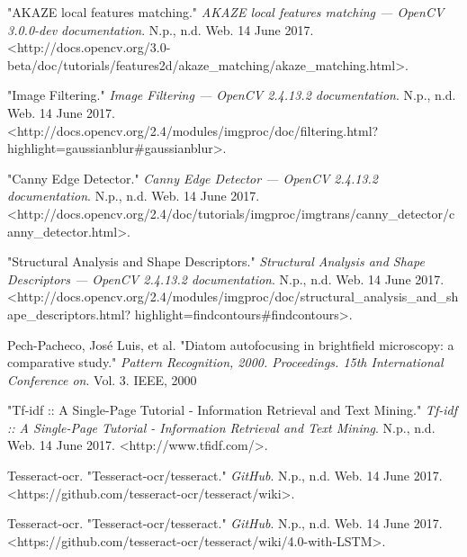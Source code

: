 \begin{lstlisting}

\end{lstlisting}




\begin{thebibliography}{1}

	 "AKAZE local features matching." {\em AKAZE local features matching — OpenCV 3.0.0-dev documentation}. N.p., n.d. Web. 14 June 2017.
	\textless http://docs.opencv.org/3.0-beta/doc/tutorials/features2d/akaze\_matching/akaze\_matching.html\textgreater.

	 "Image Filtering." {\em Image Filtering — OpenCV 2.4.13.2 documentation}. N.p., n.d. Web. 14 June 2017.
	\textless http://docs.opencv.org/2.4/modules/imgproc/doc/filtering.html?highlight=gaussianblur\#gaussianblur\textgreater.

	 "Canny Edge Detector." {\em Canny Edge Detector — OpenCV 2.4.13.2 documentation}. N.p., n.d. Web. 14 June 2017.
	\textless http://docs.opencv.org/2.4/doc/tutorials/imgproc/imgtrans/canny\_detector/canny\_detector.html\textgreater.

	 "Structural Analysis and Shape Descriptors." {\em Structural Analysis and Shape Descriptors — OpenCV 2.4.13.2 documentation}. N.p., n.d. Web. 14 June 2017.
	\textless http://docs.opencv.org/2.4/modules/imgproc/doc/structural\_analysis\_and\_shape\_descriptors.html?
	highlight=findcontours\#findcontours\textgreater.

	 Pech-Pacheco, José Luis, et al. "Diatom autofocusing in brightfield microscopy: a comparative study." {\em Pattern Recognition, 2000. Proceedings. 15th International Conference on}. Vol. 3. IEEE, 2000

	 "Tf-idf :: A Single-Page Tutorial - Information Retrieval and Text Mining." {\em Tf-idf :: A Single-Page Tutorial - Information Retrieval and Text Mining}. N.p., n.d. Web. 14 June 2017.
	\textless http://www.tfidf.com/\textgreater.

	 Tesseract-ocr. "Tesseract-ocr/tesseract." {\em GitHub}. N.p., n.d. Web. 14 June 2017.
	\textless https://github.com/tesseract-ocr/tesseract/wiki\textgreater.
	
	 Tesseract-ocr. "Tesseract-ocr/tesseract." {\em GitHub}. N.p., n.d. Web. 14 June 2017.
	\textless https://github.com/tesseract-ocr/tesseract/wiki/4.0-with-LSTM\textgreater.

\end{thebibliography}